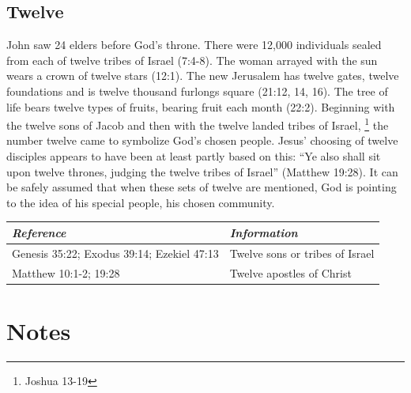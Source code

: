 \section*{Twelve}
John saw 24 elders before God's throne. There were 12,000 individuals sealed from each of twelve tribes of Israel (7:4-8). The woman arrayed with the sun wears a crown of twelve stars (12:1). The new Jerusalem has twelve gates, twelve foundations and is twelve thousand furlongs square (21:12, 14, 16). The tree of life bears twelve types of fruits, bearing fruit each month (22:2). 
\newline\newline
Beginning with the twelve sons of Jacob and then with the twelve landed tribes of Israel,%
\footnote{Joshua 13-19} %
the number twelve came to symbolize God's chosen people. Jesus' choosing of twelve disciples appears to have been at least partly based on this: ``Ye also shall sit upon twelve thrones, judging the twelve tribes of Israel'' (Matthew 19:28). 
\newline\newline
It can be safely assumed that when these sets of twelve are mentioned, God is pointing to the idea of his special people, his chosen community.
\newline\newline
\begin{tabularx}{\textwidth}{l X}
\toprule
\rowcolor{headergray}\emph{Reference} & \emph{Information}\\ 
\midrule
Genesis 35:22; Exodus 39:14; Ezekiel 47:13 & Twelve sons or tribes of Israel \\
\addlinespace
Matthew 10:1-2; 19:28 & Twelve apostles of Christ \\
\bottomrule
\end{tabularx}

\printindex[gen]
\chapter{Notes}
\fancyhead{} %
\newpage\mbox{}\cleardoublepage
\newpage\mbox{}\cleardoublepage
\renewcommand*{\BRbooktitlestyle}[1]{\textbf{#1}\nopagebreak}
\clearpage
{}
\fancyhead{} %
\printindex[scr]

